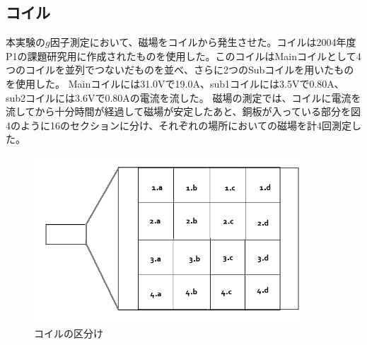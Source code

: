 \subsection{コイル}
  本実験の$g$因子測定において、磁場をコイルから発生させた。コイルは2004年度P1の課題研究用に作成されたものを使用した。このコイルはMainコイルとして4つのコイルを並列でつないだものを並べ、さらに2つのSubコイルを用いたものを使用した。
Mainコイルには31.0Vで19.0A、sub1コイルには3.5Vで0.80A、sub2コイルには3.6Vで0.80Aの電流を流した。
磁場の測定では、コイルに電流を流してから十分時間が経過して磁場が安定したあと、銅板が入っている部分を図4のように16のセクションに分け、それぞれの場所においての磁場を計4回測定した。
\begin{figure}[H]
 \begin{center}
  \includegraphics[width=10cm,bb=0 0 640 500]{coil.jpg}
  \caption{コイルの区分け}
 \end{center}
\end{figure}

